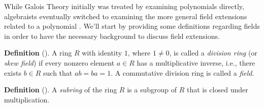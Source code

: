 \documentclass[11pt, a4paper, oneside]{article}
\theoremstyle{plain}
\theoremstyle{plain}
\theoremstyle{plain}
\theoremstyle{plain}
\theoremstyle{definition}
\theoremstyle{example}
\begin{document}
While Galois Theory initially was treated by examining polynomials directly, algebraists eventually switched to examining the more general field extensions related to a polynomial \cite[\S 4, p. 63]{stewart}. We'll start by providing some definitions regarding fields in order to have the necessary background to discuss field extensions.

\textbf{Definition} (\cite[\S 7.1]{dummit}). A ring $R$ with identity $1$, where $1 \neq 0$, is called a \textit{division ring} (or \textit{skew field}) if every nonzero element $a \in R$ has a multiplicative inverse, i.e., there exists $b \in R$ such that $ab = ba = 1$. A commutative division ring is called a \textit{field}.

\textbf{Definition} (\cite[\S 7.1]{dummit}). A \textit{subring} of the ring $R$ is a subgroup of $R$ that is closed under multiplication.
\end{document}

